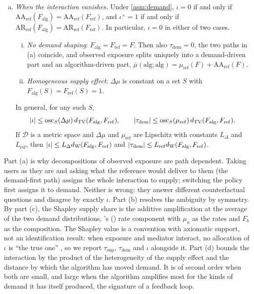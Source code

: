\begin{theorem}
\begin{enumerate}[(a)]
\[\begin{aligned}
    \phi_{\mathrm{dem}}&={\textstyle\int}\mu_{\mathrm{mid}}\,d(F_{\mathrm{alg}}-F_{\mathrm{ref}}).
  \end{aligned}
  \]
  \item \emph{When the interaction vanishes.} Under \cref{asm:demand}, $\iota=0$ if and only if $\mathrm{AA}_{\mathrm{ref}}(F_{\mathrm{alg}})=\mathrm{AA}_{\mathrm{ref}}(F_{\mathrm{ref}})$, and $\iota^{\times}=1$ if and only if $\mathrm{AR}_{\mathrm{ref}}(F_{\mathrm{alg}})=\mathrm{AR}_{\mathrm{ref}}(F_{\mathrm{ref}})$. In particular, $\iota=0$ in either of two cases.
  \begin{enumerate}[(i)]
    \item \emph{No demand shaping}: $F_{\mathrm{alg}}=F_{\mathrm{ref}}=F$. Then also $\tau_{\mathrm{dem}}=0$, the two paths in (a) coincide, and observed exposure splits uniquely into a demand-driven part and an algorithm-driven part, $\bar\mu(\mathrm{alg};\mathrm{alg})=\mu_{\mathrm{ref}}(F)+\mathrm{AA}_{\mathrm{ref}}(F)$.
    \item \emph{Homogeneous supply effect}: $\Delta\mu$ is constant on a set $S$ with $F_{\mathrm{alg}}(S)=F_{\mathrm{ref}}(S)=1$.
  \end{enumerate}
  In general, for any such $S$,
  \[
    |\iota|\le\operatorname{osc}_S(\Delta\mu)\,d_{\mathrm{TV}}(F_{\mathrm{alg}},F_{\mathrm{ref}}),\qquad
    |\tau_{\mathrm{dem}}|\le\operatorname{osc}_S(\mu_{\mathrm{ref}})\,d_{\mathrm{TV}}(F_{\mathrm{alg}},F_{\mathrm{ref}}).
  \]
  If $\mathcal D$ is a metric space and $\Delta\mu$ and $\mu_{\mathrm{ref}}$ are Lipschitz with constants $L_\Delta$ and $L_{\mathrm{ref}}$, then $|\iota|\le L_\Delta d_{\mathrm{W}}(F_{\mathrm{alg}},F_{\mathrm{ref}})$ and $|\tau_{\mathrm{dem}}|\le L_{\mathrm{ref}}d_{\mathrm{W}}(F_{\mathrm{alg}},F_{\mathrm{ref}})$.
\end{enumerate}
\end{theorem}

Part (a) is why decompositions of observed exposure are path dependent. Taking users as they are and asking what the reference would deliver to them (the demand-first path) assigns the whole interaction to supply; switching the policy first assigns it to demand. Neither is wrong: they answer different counterfactual questions and disagree by exactly $\iota$. Part (b) resolves the ambiguity by symmetry. By part (c), the Shapley supply share is the additive amplification at the average of the two demand distributions, \citeauthor{kitagawa1955}'s (\citeyear{kitagawa1955}) rate component with $\mu_a$ as the rates and $F_b$ as the composition. The Shapley value is a convention with axiomatic support, not an identification result: when exposure and mediator interact, no allocation of $\iota$ is ``the true one'' \citep{robins1992}, so we report $\tau_{\mathrm{sup}}$, $\tau_{\mathrm{dem}}$ and $\iota$ alongside it. Part (d) bounds the interaction by the product of the heterogeneity of the supply effect and the distance by which the algorithm has moved demand. It is of second order when both are small, and large when the algorithm amplifies most for the kinds of demand it has itself produced, the signature of a feedback loop.

